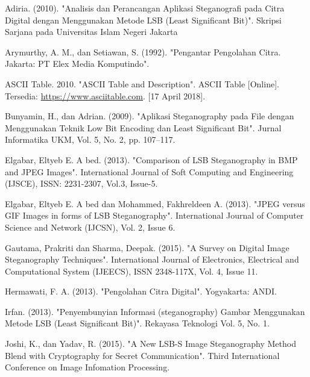 \documentclass{jtetiskripsi}
\begin{document}
%
\begin{thebibliography}{99}
	Adiria. (2010). "Analisis dan Perancangan Aplikasi Steganografi pada Citra Digital dengan Menggunakan Metode LSB (Least Significant Bit)". Skripsi Sarjana pada Universitas Islam Negeri Jakarta
	
	Arymurthy, A. M., dan Setiawan, S. (1992). "Pengantar Pengolahan Citra. Jakarta: PT Elex Media Komputindo".
	
	 ASCII Table.  2010. "ASCII Table and Description".  ASCII Table [Online]. Tersedia: \url{https://www.asciitable.com}. [17 April 2018].
	
	Bunyamin, H., dan Adrian. (2009). "Aplikasi Steganography pada File dengan Menggunakan Teknik Low Bit Encoding dan Least Significant Bit". Jurnal Informatika UKM, Vol. 5, No. 2, pp. 107–117.
	
	Elgabar, Eltyeb E. A bed. (2013). "Comparison of LSB Steganography in BMP and JPEG Images". International Journal of Soft Computing and Engineering (IJSCE), ISSN: 2231-2307, Vol.3, Issue-5.
	
	Elgabar, Eltyeb E. A bed dan Mohammed, Fakhreldeen A. (2013). "JPEG versus GIF Images in forms of LSB Steganography".  International Journal of Computer Science and Network (IJCSN), Vol. 2, Issue 6.
	
	Gautama, Prakriti dan Sharma, Deepak. (2015). "A Survey on Digital Image Steganography Techniques". International Journal of Electronics, Electrical and Computational System (IJEECS), ISSN 2348-117X, Vol. 4, Issue 11. 
	
	Hermawati, F. A. (2013). "Pengolahan Citra Digital". Yogyakarta: ANDI.
	
	Irfan. (2013). "Penyembunyian Informasi (steganography) Gambar Menggunakan Metode LSB (Least Significant Bit)". Rekayasa Teknologi Vol. 5, No. 1.
	
	Joshi, K., dan Yadav, R. (2015). "A New LSB-S Image Steganography Method Blend with Cryptography for Secret Communication". Third International Conference on Image Infomation Processing.
	

\end{thebibliography}
\end{document}
